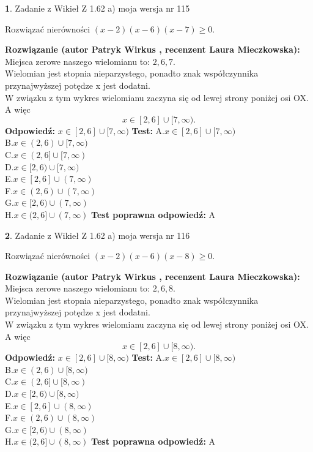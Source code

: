 \documentclass[12pt, a4paper]{article}
\theoremstyle{definition} %
\newtheorem{zad}{}
\newcommand{\zadStart}[1]{\begin{zad}#1\newline}
\newcommand{\zadStop}{\end{zad}}
\newcommand{\rozwStart}[2]{\noindent \textbf{Rozwiązanie (autor #1 , recenzent #2): }\newline}
\newcommand{\rozwStop}{\newline}
\newcommand{\odpStart}{\noindent \textbf{Odpowiedź:}\newline}
\newcommand{\odpStop}{\newline}
\newcommand{\testStart}{\noindent \textbf{Test:}\newline}
\newcommand{\testStop}{\newline}
\newcommand{\kluczStart}{\noindent \textbf{Test poprawna odpowiedź:}\newline}
\newcommand{\kluczStop}{\newline}
\begin{document}
\zadStart{Zadanie z Wikieł Z 1.62 a) moja wersja nr 115}

Rozwiązać nierówności $(x-2)(x-6)(x-7)\ge0$.
\zadStop
\rozwStart{Patryk Wirkus}{Laura Mieczkowska}
Miejsca zerowe naszego wielomianu to: $2, 6, 7$.\\
Wielomian jest stopnia nieparzystego, ponadto znak współczynnika przy\linebreak najwyższej potędze x jest dodatni.\\ W związku z tym wykres wielomianu zaczyna się od lewej strony poniżej osi OX. A więc $$x \in [2,6] \cup [7,\infty).$$
\rozwStop
\odpStart
$x \in [2,6] \cup [7,\infty)$
\odpStop
\testStart
A.$x \in [2,6] \cup [7,\infty)$\\
B.$x \in (2,6) \cup [7,\infty)$\\
C.$x \in (2,6] \cup [7,\infty)$\\
D.$x \in [2,6) \cup [7,\infty)$\\
E.$x \in [2,6] \cup (7,\infty)$\\
F.$x \in (2,6) \cup (7,\infty)$\\
G.$x \in [2,6) \cup (7,\infty)$\\
H.$x \in (2,6] \cup (7,\infty)$
\testStop
\kluczStart
A
\kluczStop



\zadStart{Zadanie z Wikieł Z 1.62 a) moja wersja nr 116}

Rozwiązać nierówności $(x-2)(x-6)(x-8)\ge0$.
\zadStop
\rozwStart{Patryk Wirkus}{Laura Mieczkowska}
Miejsca zerowe naszego wielomianu to: $2, 6, 8$.\\
Wielomian jest stopnia nieparzystego, ponadto znak współczynnika przy\linebreak najwyższej potędze x jest dodatni.\\ W związku z tym wykres wielomianu zaczyna się od lewej strony poniżej osi OX. A więc $$x \in [2,6] \cup [8,\infty).$$
\rozwStop
\odpStart
$x \in [2,6] \cup [8,\infty)$
\odpStop
\testStart
A.$x \in [2,6] \cup [8,\infty)$\\
B.$x \in (2,6) \cup [8,\infty)$\\
C.$x \in (2,6] \cup [8,\infty)$\\
D.$x \in [2,6) \cup [8,\infty)$\\
E.$x \in [2,6] \cup (8,\infty)$\\
F.$x \in (2,6) \cup (8,\infty)$\\
G.$x \in [2,6) \cup (8,\infty)$\\
H.$x \in (2,6] \cup (8,\infty)$
\testStop
\kluczStart
A
\kluczStop
\end{document}

